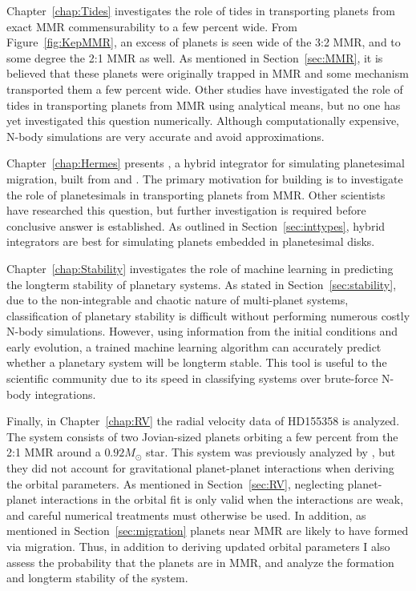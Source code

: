 Chapter~\ref{chap:Tides} investigates the role of tides in transporting planets from exact MMR commensurability to a few percent wide. 
From Figure~\ref{fig:KepMMR}, an excess of planets is seen wide of the 3:2 MMR, and to some degree the 2:1 MMR as well. 
As mentioned in Section~\ref{sec:MMR}, it is believed that these planets were originally trapped in MMR and some mechanism transported them a few percent wide. 
Other studies have investigated the role of tides in transporting planets from MMR using analytical \citep{Lee2013, Delisle2014} means, but no one has yet investigated this question numerically.
Although computationally expensive, N-body simulations are very accurate and avoid approximations. 

Chapter~\ref{chap:Hermes} presents \hermes, a hybrid integrator for simulating planetesimal migration, built from \ias \citep{Rein2015a} and \whfast \citep{Rein2015b}. 
The primary motivation for building \hermes is to investigate the role of planetesimals in transporting planets from MMR. 
Other scientists \citep{Chatterjee2015} have researched this question, but further investigation is required before conclusive answer is established.
As outlined in Section~\ref{sec:inttypes}, hybrid integrators are best for simulating planets embedded in planetesimal disks. 

Chapter~\ref{chap:Stability} investigates the role of machine learning in predicting the longterm stability of planetary systems. 
As stated in Section~\ref{sec:stability}, due to the non-integrable and chaotic nature of multi-planet systems, classification of planetary stability is difficult without performing numerous costly N-body simulations. 
However, using information from the initial conditions and early evolution, a trained machine learning algorithm can accurately predict whether a planetary system will be longterm stable.  
This tool is useful to the scientific community due to its speed in classifying systems over brute-force N-body integrations.  

Finally, in Chapter~\ref{chap:RV} the radial velocity data of HD155358 is analyzed. 
The system consists of two Jovian-sized planets orbiting a few percent from the 2:1 MMR around a $0.92M_{\odot}$ star. 
This system was previously analyzed by \citet{Robertson2012}, but they did not account for gravitational planet-planet interactions when deriving the orbital parameters.
As mentioned in Section~\ref{sec:RV}, neglecting planet-planet interactions in the orbital fit is only valid when the interactions are weak, and careful numerical treatments must otherwise be used. 
In addition, as mentioned in Section~\ref{sec:migration} planets near MMR are likely to have formed via migration.
Thus, in addition to deriving updated orbital parameters I also assess the probability that the planets are in MMR, and analyze the formation and longterm stability of the system. 

